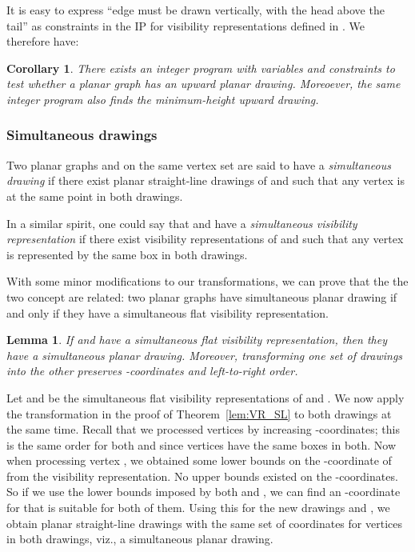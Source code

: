 \documentclass{elsarticle}
\newtheorem{lemma}{Lemma}
\newtheorem{corollary}{Corollary}
\newenvironment{proof}{{\bf Proof: }}{\hspace*{\fill}\medskip}
\begin{document}
It is easy to express ``edge  must be drawn vertically,
with the head above the tail'' as constraints in the IP 
for visibility representations defined in \cite{Bie-GD13}.  We therefore
have:

\begin{corollary}
There exists an integer program with  variables and
constraints to test whether a planar graph has an upward planar drawing.
Moreoever, the same integer program also finds the minimum-height
upward drawing.
\end{corollary}

\iffalse
\subsubsection{Simultaneous drawings}

Two planar graphs  and  on the same vertex set  are said
to have a {\em simultaneous drawing} if there exist planar straight-line
drawings of  and  such that any vertex is at the same point
in both drawings.

In a similar spirit, one could say that  and  have a
{\em simultaneous visibility representation} if there exist
visibility representations of  and  such that any vertex 
is represented by the same box in both drawings.

With some minor modifications to our transformations, we can prove
that the the two concept are related: two planar graphs have simultaneous
planar drawing if and only if they have a simultaneous flat visibility
representation.

\begin{lemma}
\label{lem:VR_SL_simultaneous}
If  and  have a simultaneous flat visibility representation,
then they have a simultaneous planar drawing.  
Moreover, transforming
one set of drawings into the other preserves -coordinates and
left-to-right order.
\end{lemma}
\begin{proof}
Let  and  be the simultaneous flat visibility
representations of  and .  We now apply the transformation
in the proof of Theorem~\ref{lem:VR_SL} to both drawings at the
same time.  Recall that we processed vertices by increasing
-coordinates; this is the same order for both  and
 since vertices have the same boxes in both.  Now
when processing vertex , we obtained some lower bounds 
on the -coordinate of  from the visibility representation.
No upper bounds existed on the -coordinates.  So if we use 
the lower bounds imposed by both  and , we
can find an -coordinate for  that is suitable for both
of them.  Using this for the new drawings  and ,
we obtain planar straight-line drawings with the same set of
coordinates for vertices in both drawings, viz., a simultaneous
planar drawing.
\end{proof}
\end{document}
